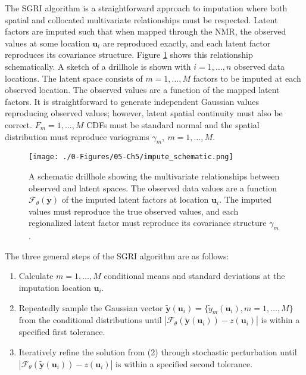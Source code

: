 The \gls{SGRI} algorithm is a straightforward approach to imputation where both spatial and collocated multivariate relationships must be respected. Latent factors are imputed such that when mapped through the \gls{NMR}, the observed values at some location $\mathbf{u}_{i}$ are reproduced exactly, and each latent factor reproduces its covariance structure. Figure \ref{fig:impute_schematic} shows this relationship schematically. A sketch of a drillhole is shown with $i=1,\dots,n$ observed data locations. The latent space consists of $m=1,\dots,M$ factors to be imputed at each observed location. The observed values are a function of the mapped latent factors. It is straightforward to generate independent Gaussian values reproducing observed values; however, latent spatial continuity must also be correct. $F_{m}=1,\dots,M$ \glspl{CDF} must be standard normal and the spatial distribution must reproduce variograms $\gamma_{m}, \ m=1,\dots,M$.

\begin{figure}[htb!]
    \centering
    \texttt{[image: ./0-Figures/05-Ch5/impute\_schematic.png]}
    \caption{A schematic drillhole showing the multivariate relationships between observed and latent spaces. The observed data values are a function $\mathcal{F}_{\theta}\left(\mathbf{y}\right)$ of the imputed latent factors at location $\mathbf{u}_{i}$. The imputed values must reproduce the true observed values, and each regionalized latent factor must reproduce its covariance structure $\gamma_{m}$. }
    \label{fig:impute_schematic}
\end{figure}

The three general steps of the \gls{SGRI} algorithm are as follows:
\begin{enumerate}[noitemsep]
    \item Calculate $m=1,\dots,M$ conditional means and standard deviations at the imputation location $\mathbf{u}_{i}$.
    \item Repeatedly sample the Gaussian vector $\tilde{\mathbf{y}}(\mathbf{u}_{i}) = \{\tilde{y}_{m}(\mathbf{u}_{i}), m=1,\dots,M \}$ from the conditional distributions until $\left|\mathcal{F}_{\theta}(\tilde{\mathbf{y}}(\mathbf{u}_{i})) - z(\mathbf{u}_{i})\right|$ is within a specified first tolerance.
    \item Iteratively refine the solution from (2) through stochastic perturbation until $\left|\mathcal{F}_{\theta}(\tilde{\mathbf{y}}(\mathbf{u}_{i})) - z(\mathbf{u}_{i})\right|$ is within a specified second tolerance.
\end{enumerate}


